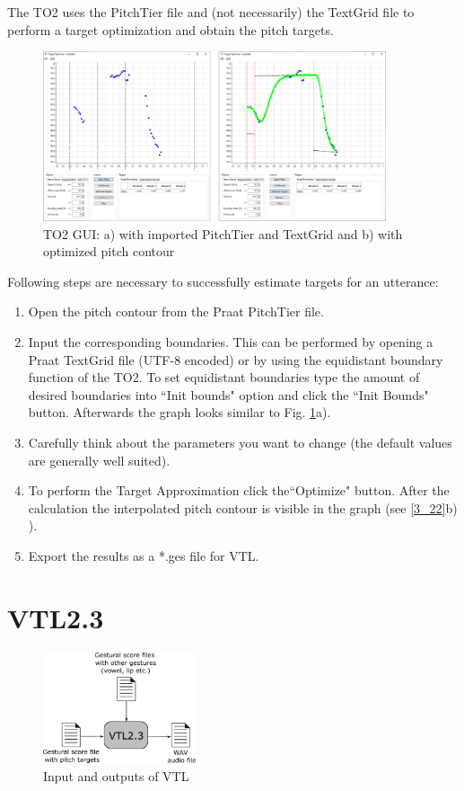 The TO2 uses the PitchTier file and (not necessarily) the TextGrid file to perform a target optimization and obtain the pitch targets.

\begin{figure}[H]
\centering
\includegraphics[width=0.9\textwidth]{images/3_22.png}
\caption{TO2 GUI: a) with imported PitchTier and TextGrid and b) with optimized pitch contour}
\label{3_22}
\end{figure}

Following steps are necessary to successfully estimate targets for an utterance:
\begin{enumerate}
	\item Open the pitch contour from the Praat PitchTier file.
	\item Input the corresponding boundaries. This can be performed by opening a Praat TextGrid file (UTF-8 encoded) or by using the equidistant boundary function of the TO2. To set equidistant boundaries type the amount of desired boundaries into ``Init bounds" option and click the ``Init Bounds" button. Afterwards the graph looks similar to Fig. \ref{3_22}a).
	\item Carefully think about the parameters you want to change (the default values are generally well suited).
	\item To perform the Target Approximation click the``Optimize" button. After the calculation the interpolated pitch contour is visible in the graph (see \autoref{3_22}b) ).
	\item Export the results as a *.ges file for VTL. 
\end{enumerate}

\section{VTL2.3}

\begin{figure}[H]
\centering
\includegraphics[width=0.4\textwidth]{images/3_31.png}
\caption{Input and outputs of VTL}
\label{3_31}
\end{figure}

